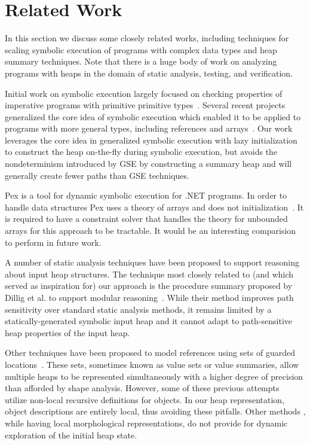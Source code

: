 \section{Related Work}
\label{related}

In this section we discuss some closely related works, including
techniques for scaling symbolic execution of programs with complex
data types and heap summary techniques. Note that there is a huge body
of work on analyzing programs with heaps in the domain of static
analysis, testing, and verification.

Initial work on symbolic execution largely focused on checking
properties of imperative programs with primitive primitive
types~\cite{Clarke:76,King:76}. Several recent projects generalized
the core idea of symbolic execution which enabled it to be applied to
programs with more general types, including references and
arrays~\cite{GSE03,Godefroid:PLDI05,Sen:FSE05,CadarEngler05EXE,KiasanKunit}.
Our work leverages the core idea in generalized symbolic execution
with lazy initialization to construct the heap on-the-fly during
symbolic execution, but avoids the nondeterminism introduced by GSE by
constructing a summary heap and will generally create fewer paths than
GSE techniques.

Pex is a tool for dynamic symbolic execution for .NET programs. In
order to handle data structures Pex uses a theory of arrays and does
not initialization~\cite{export:81193}.  It is required to have a
constraint solver that handles the theory for unbounded arrays for
this approach to be tractable. It would be an interesting comparision
to perform in future work.

A number of static analysis techniques have been proposed to support
reasoning about input heap structures. The technique most closely
related to (and which served as inspiration for) our approach is the
procedure summary proposed by Dillig et al. to support modular
reasoning~\cite{Dillig:2011}.  While their method improves path
sensitivity over standard static analysis methods, it remains limited
by a statically-generated symbolic input heap and it cannot adapt to
path-sensitive heap properties of the input heap.

Other techniques have been proposed to model references using sets of
guarded
locations~\cite{Xie:2005,Cherem:2007,Dillig:2011,Sen:2014}. These
sets, sometimes known as value sets or value summaries, allow multiple
heaps to be represented simultaneously with a higher degree of
precision than afforded by shape analysis. However, some of these
previous attempts~\cite{Xie:2005,Cherem:2007} utilize non-local
recursive definitions for objects.  In our heap representation, object descriptions are
entirely local, thus avoiding these pitfalls. Other methods
\cite{Dillig:2011,Sen:2014}, while having local morphological
representations, do not provide for dynamic exploration of the initial
heap state.

